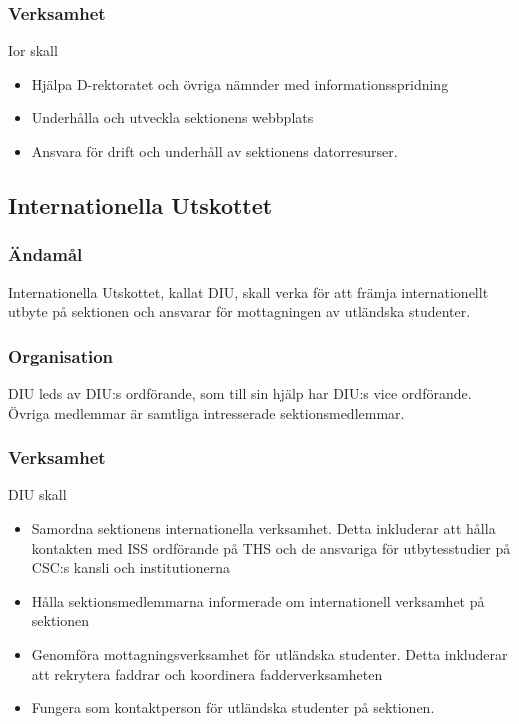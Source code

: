 \documentclass{dgovdoc}
\begin{document}
\subsubsection{Verksamhet}

Ior skall

\begin{itemize}
  \item Hjälpa D-rektoratet och övriga nämnder med informationsspridning
  \item Underhålla och utveckla sektionens webbplats
  \item Ansvara för drift och underhåll av sektionens datorresurser.
\end{itemize}

\subsection{Internationella Utskottet}

\subsubsection{Ändamål}

Internationella Utskottet, kallat DIU, skall verka för att främja
internationellt utbyte på sektionen och ansvarar för mottagningen av utländska
studenter.

\subsubsection{Organisation}

DIU leds av DIU:s ordförande, som till sin hjälp har DIU:s vice ordförande.
Övriga medlemmar är samtliga intresserade sektionsmedlemmar.

\subsubsection{Verksamhet}

DIU skall

\begin{itemize}
  \item Samordna sektionens internationella verksamhet. Detta inkluderar att
    hålla kontakten med ISS ordförande på THS och de ansvariga för
    utbytesstudier på CSC:s kansli och institutionerna
  \item Hålla sektionsmedlemmarna informerade om internationell verksamhet på
    sektionen
  \item Genomföra mottagningsverksamhet för utländska studenter. Detta
    inkluderar att rekrytera faddrar och koordinera fadderverksamheten
  \item Fungera som kontaktperson för utländska studenter på sektionen.
\end{itemize}
\end{document}
